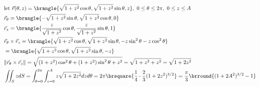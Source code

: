 \begin{align*}
    &\text{let }\vec{r}(\theta,z)=\brangle{\sqrt{1+z^2}\cos\theta,\sqrt{1+z^2}\sin\theta,z},\ 0\leq\theta\leq 2\pi,\ 0\leq z\leq A\\
    &\vec{r}_\theta=\brangle{-\sqrt{1+z^2}\sin\theta,\sqrt{1+z^2}\cos\theta,0}\\
    &\vec{r}_z=\brangle{\frac{z}{\sqrt{1+z^2}}\cos\theta,\frac{z}{\sqrt{1+z^2}}\sin\theta,1}\\
    &\vec{r}_\theta\times\vec{r}_z=\brangle{\sqrt{1+z^2}\cos\theta,\sqrt{1+z^2}\sin\theta,-z\sin^2\theta-z\cos^2\theta}\\
    &=\brangle{\sqrt{1+z^2}\cos\theta,\sqrt{1+z^2}\sin\theta,-z}\\
    &\|\vec{r}_\theta\times\vec{r}_z\|=\sqrt{(1+z^2)\cos^2\theta+(1+z^2)\sin^2\theta+z^2}=\sqrt{1+z^2+z^2}=\sqrt{1+2z^2}\\
    &\iint_S zdS=\int_{\theta=0}^{2\pi}\int_{z=0}^Az\sqrt{1+2z^2}dzd\theta=2\pi\brsquare{\frac{1}{4}\cdot\frac{2}{3}(1+2z^2)^{3/2}}=\frac{\pi}{3}\brround{(1+2A^2)^{3/2}-1}
\end{align*}
